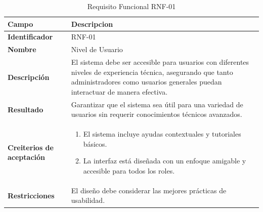\begin{table}[htb!]
    \centering
    \caption{Requisito Funcional RNF-01}
    \begin{tabular}{|p{3cm}|p{12cm}|}
    \hline
    \textbf{Campo} & \textbf{Descripcion} \\ \hline
    \textbf{Identificador} & RNF-01 \\ \hline
    \textbf{Nombre} &  Nivel de Usuario \\ \hline
    \textbf{Descripción} &  El sistema debe ser accesible para usuarios con diferentes niveles de experiencia técnica, asegurando que tanto administradores como usuarios generales puedan interactuar de manera efectiva. \\ \hline
    \textbf{Resultado} &  Garantizar que el sistema sea útil para una variedad de usuarios sin requerir conocimientos técnicos avanzados. \\ \hline
    \textbf{Creiterios de aceptación} & 
    \begin{enumerate}
        \item El sistema incluye ayudas contextuales y tutoriales básicos.
        \item La interfaz está diseñada con un enfoque amigable y accesible para todos los roles.
        
    \end{enumerate}
    \\ \hline
    \textbf{Restricciones} & El diseño debe considerar las mejores prácticas de usabilidad. \\ \hline
    
\end{tabular}
\end{table}
\FloatBarrier

